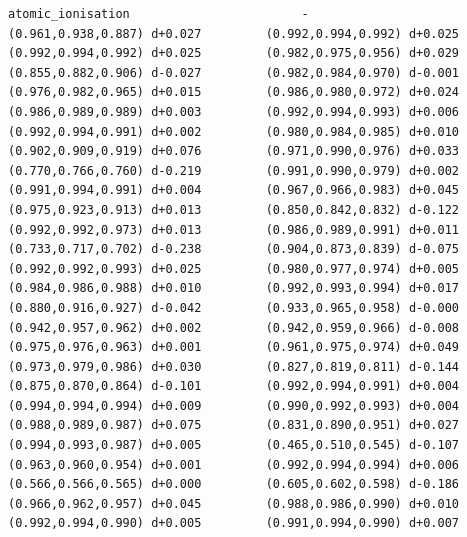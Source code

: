 \documentclass[11pt, letterpaper, openany]{book}
\begin{document}
\begin{empiricalbox}
\begin{lstlisting}[style=terminal]
atomic_ionisation                        -                      (0.961,0.938,0.887) d+0.027         (0.992,0.994,0.992) d+0.025         (0.992,0.994,0.992) d+0.025         (0.982,0.975,0.956) d+0.029         (0.855,0.882,0.906) d-0.027         (0.982,0.984,0.970) d-0.001         (0.976,0.982,0.965) d+0.015         (0.986,0.980,0.972) d+0.024         (0.986,0.989,0.989) d+0.003         (0.992,0.994,0.993) d+0.006         (0.992,0.994,0.991) d+0.002         (0.980,0.984,0.985) d+0.010         (0.902,0.909,0.919) d+0.076         (0.971,0.990,0.976) d+0.033         (0.770,0.766,0.760) d-0.219         (0.991,0.990,0.979) d+0.002         (0.991,0.994,0.991) d+0.004         (0.967,0.966,0.983) d+0.045         (0.975,0.923,0.913) d+0.013         (0.850,0.842,0.832) d-0.122         (0.992,0.992,0.973) d+0.013         (0.986,0.989,0.991) d+0.011         (0.733,0.717,0.702) d-0.238         (0.904,0.873,0.839) d-0.075         (0.992,0.992,0.993) d+0.025         (0.980,0.977,0.974) d+0.005         (0.984,0.986,0.988) d+0.010         (0.992,0.993,0.994) d+0.017         (0.880,0.916,0.927) d-0.042         (0.933,0.965,0.958) d-0.000         (0.942,0.957,0.962) d+0.002         (0.942,0.959,0.966) d-0.008         (0.975,0.976,0.963) d+0.001         (0.961,0.975,0.974) d+0.049         (0.973,0.979,0.986) d+0.030         (0.827,0.819,0.811) d-0.144         (0.875,0.870,0.864) d-0.101         (0.992,0.994,0.991) d+0.004         (0.994,0.994,0.994) d+0.009         (0.990,0.992,0.993) d+0.004         (0.988,0.989,0.987) d+0.075         (0.831,0.890,0.951) d+0.027         (0.994,0.993,0.987) d+0.005         (0.465,0.510,0.545) d-0.107         (0.963,0.960,0.954) d+0.001         (0.992,0.994,0.994) d+0.006         (0.566,0.566,0.565) d+0.000         (0.605,0.602,0.598) d-0.186         (0.966,0.962,0.957) d+0.045         (0.988,0.986,0.990) d+0.010         (0.992,0.994,0.990) d+0.005         (0.991,0.994,0.990) d+0.007     

\end{lstlisting}
\end{empiricalbox}
\end{document}
